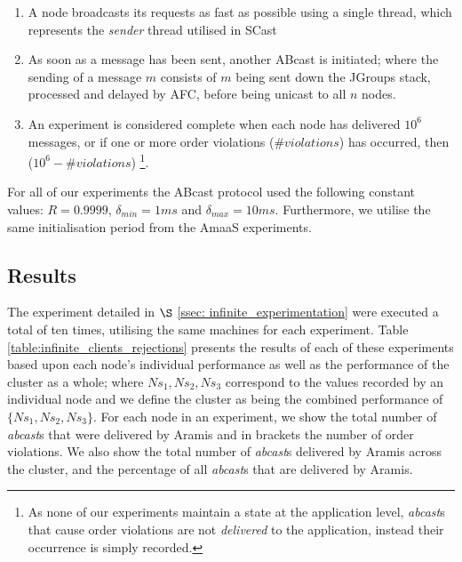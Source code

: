     \begin{enumerate}
        \item    A node broadcasts its requests as fast as possible using a single thread, which represents the \emph{sender} thread utilised in \textsf{SCast}
        
        \item    As soon as a message has been sent, another \textsf{ABcast} is initiated; where the sending of a message $m$ consists of $m$ being sent down the JGroups stack, processed and delayed by AFC, before being unicast to all $n$ nodes.  
        
        \item    An experiment is considered complete when each node has delivered $10^6$ messages, or if one or more order violations ($\#violations$) has occurred, then ($10^6 - \#violations$) \footnote{As none of our experiments maintain a state at the application level, \emph{abcast}s that cause order violations are not \emph{delivered} to the application, instead their occurrence is simply recorded.}.  
    \end{enumerate}
    
    For all of our experiments the \textsf{ABcast} protocol used the following constant values: $R = 0.9999$, $\delta_{min} = 1ms$ and $\delta_{max} = 10ms$.  Furthermore, we utilise the same initialisation period from the \textsf{AmaaS} experiments.  
    
    \subsection{Results}
The experiment detailed in $\S$ \ref{ssec: infinite_experimentation} were executed a total of ten times, utilising the same machines for each experiment.  Table \ref{table:infinite_clients_rejections} presents the results of each of these experiments based upon each node's individual performance as well as the performance of the cluster as a whole; where $Ns_1, Ns_2, Ns_3$ correspond to the values recorded by an individual node and we define the cluster as being the combined performance of $\{Ns_1,Ns_2,Ns_3\}$.  For each node in an experiment, we show the total number of \emph{abcast}s that were delivered by \textsf{Aramis} and in brackets the number of order violations.  We also show the total number of \emph{abcast}s delivered by \textsf{Aramis} across the cluster, and the percentage of all \emph{abcast}s that are delivered by \textsf{Aramis}.  
    
